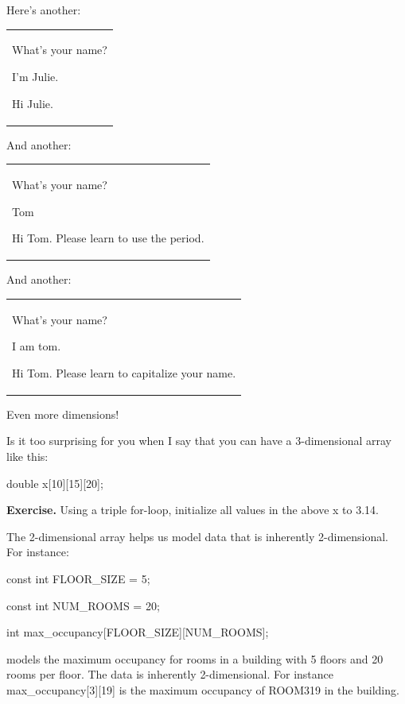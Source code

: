 Here's another:

\begin{longtable}[]{@{}
  >{\raggedright\arraybackslash}p{}@{}}
\toprule\noalign{}
 \\
\midrule\noalign{}
\endhead
\bottomrule\noalign{}
\endlastfoot
What's your name?

I'm Julie.

Hi Julie. \\
\end{longtable}

And another:

\begin{longtable}[]{@{}
  >{\raggedright\arraybackslash}p{}@{}}
\toprule\noalign{}
 \\
\midrule\noalign{}
\endhead
\bottomrule\noalign{}
\endlastfoot
What's your name?

Tom

Hi Tom. Please learn to use the period. \\
\end{longtable}

And another:

\begin{longtable}[]{@{}
  >{\raggedright\arraybackslash}p{}@{}}
\toprule\noalign{}
 \\
\midrule\noalign{}
\endhead
\bottomrule\noalign{}
\endlastfoot
What's your name?

I am tom.

Hi Tom. Please learn to capitalize your name. \\
\end{longtable}

Even more dimensions!

Is it too surprising for you when I say that you can have a
3-dimensional array like this:

double x{[}10{]}{[}15{]}{[}20{]};

\textbf{Exercise.} Using a triple for-loop, initialize all values in the
above x to 3.14.

The 2-dimensional array helps us model data that is inherently
2-dimensional. For instance:

const int FLOOR\_SIZE = 5;

const int NUM\_ROOMS = 20;

int max\_occupancy{[}FLOOR\_SIZE{]}{[}NUM\_ROOMS{]};

models the maximum occupancy for rooms in a building with 5 floors and
20 rooms per floor. The data is inherently 2-dimensional. For instance
max\_occupancy{[}3{]}{[}19{]} is the maximum occupancy of ROOM319 in the
building.

